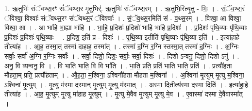 \documentclass[17pt]{extarticle}
\begin{document}
1. ऋ॒तुभिः॑ संॅवथ्स॒रꣳ सं॑ॅवथ्स॒र मृ॒तुभिर्॑. ऋ॒तुभिः॑ संॅवथ्स॒रम् । . ऋ॒तुभि॒रित्यृ॒तु - भिः॒ । . सं॒ॅव॒थ्स॒रं ॅविश्वा॒ विश्वाः᳚ संॅवथ्स॒रꣳ सं॑ॅवथ्स॒रं ॅविश्वाः᳚ । . सं॒ॅव॒थ्स॒रमिति॑ सं - व॒थ्स॒रम् । . विश्वा॒ आ विश्वा॒ विश्वा॒ आ । . आ भा॑हि भा॒ह्या भा॑हि । . भा॒हि॒ प्र॒दिशः॑ प्र॒दिशो॑ भाहि भाहि प्र॒दिशः॑ । . प्र॒दिशः॑ पृथि॒व्याः पृ॑थि॒व्याः प्र॒दिशः॑ प्र॒दिशः॑ पृथि॒व्याः । . प्र॒दिश॒ इति॑ प्र - दिशः॑ । . पृ॒थि॒व्या इतीति॑ पृथि॒व्याः पृ॑थि॒व्या इति॑ । . इत्या॑हा॒हे तीत्या॑ह । . आ॒ह॒ तस्मा॒त् तस्मा॑ दाहाह॒ तस्मा᳚त् । . तस्मा॑ द॒ग्नि र॒ग्नि स्तस्मा॒त् तस्मा॑ द॒ग्निः । . अ॒ग्निः सर्वाः॒ सर्वा॑ अ॒ग्नि र॒ग्निः सर्वाः᳚ । . सर्वा॒ दिशो॒ दिशः॒ सर्वाः॒ सर्वा॒ दिशः॑ । . दिशो ऽन्वनु॒ दिशो॒ दिशो ऽनु॑ । . अनु॒ वि व्यन्वनु॒ वि । . वि भा॑ति भाति॒ वि वि भा॑ति । . भा॒ति॒ प्रति॒ प्रति॑ भाति भाति॒ प्रति॑ । . प्रत्यौ॑हता मौहता॒म् प्रति॒ प्रत्यौ॑हताम् । . औ॒ह॒ता॒ म॒श्विना॒ ऽश्विनौ॑हता मौहता म॒श्विना᳚ । . अ॒श्विना॑ मृ॒त्युम् मृ॒त्यु म॒श्विना॒ ऽश्विना॑ मृ॒त्युम् । . मृ॒त्यु म॑स्मा दस्मान् मृ॒त्युम् मृ॒त्यु म॑स्मात् । . अ॒स्मा॒ दितीत्य॑स्मा दस्मा॒ दिति॑ । . इत्या॑हा॒हे तीत्या॑ह । . आ॒ह॒ मृ॒त्युम् मृ॒त्यु मा॑हाह मृ॒त्युम् । . मृ॒त्यु मे॒वैव मृ॒त्युम् मृ॒त्यु मे॒व । . ए॒वास्मा॑ दस्मा दे॒वैवास्मा᳚त् । \newline
\end{document}
